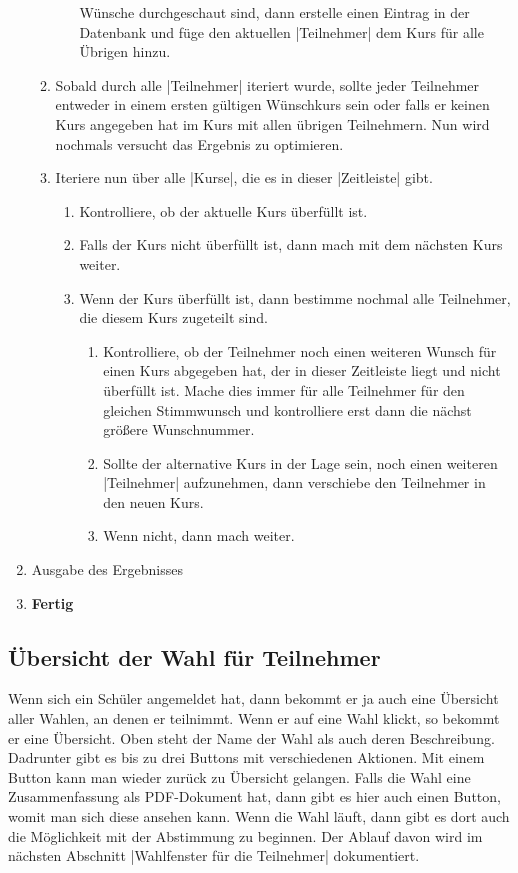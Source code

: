 \documentclass[ngerman]{ltxdoc}
\begin{document}
\begin{enumerate}
\begin{enumerate}
\begin{enumerate}
      Wünsche durchgeschaut sind, dann erstelle einen Eintrag in der Datenbank und
      füge den aktuellen |Teilnehmer| dem Kurs für alle Übrigen hinzu.
    \end{enumerate}
    \item Sobald durch alle |Teilnehmer| iteriert wurde, sollte jeder Teilnehmer
    entweder in einem ersten gültigen Wünschkurs sein oder falls er keinen Kurs
    angegeben hat im Kurs mit allen übrigen Teilnehmern. Nun wird nochmals
    versucht das Ergebnis zu optimieren.
    \item Iteriere nun über alle |Kurse|, die es in dieser |Zeitleiste| gibt.
    \begin{enumerate}
      \item Kontrolliere, ob der aktuelle Kurs überfüllt ist.
      \item Falls der Kurs nicht überfüllt ist, dann mach mit dem nächsten Kurs
      weiter.
      \item Wenn der Kurs überfüllt ist, dann bestimme nochmal alle Teilnehmer,
      die diesem Kurs zugeteilt sind.
      \begin{enumerate}
        \item Kontrolliere, ob der Teilnehmer noch einen weiteren Wunsch für einen
        Kurs abgegeben hat, der in dieser Zeitleiste liegt und nicht überfüllt ist.
        Mache dies immer für alle Teilnehmer für den gleichen Stimmwunsch und
        kontrolliere erst dann die nächst größere Wunschnummer.
        \item Sollte der alternative Kurs in der Lage sein, noch einen weiteren
        |Teilnehmer| aufzunehmen, dann verschiebe den Teilnehmer in den neuen Kurs.
        \item Wenn nicht, dann mach weiter.
      \end{enumerate}
    \end{enumerate}
  \end{enumerate}
  \item Ausgabe des Ergebnisses
  \item \textbf{Fertig}
\end{enumerate}

\subsection{Übersicht der Wahl für Teilnehmer}

Wenn sich ein Schüler angemeldet hat, dann bekommt er ja auch eine Übersicht
aller Wahlen, an denen er teilnimmt. Wenn er auf eine Wahl klickt, so bekommt
er eine Übersicht. Oben steht der Name der Wahl als auch deren Beschreibung. Dadrunter
gibt es bis zu drei Buttons mit verschiedenen Aktionen. Mit einem Button kann man
wieder zurück zu Übersicht gelangen. Falls die Wahl eine Zusammenfassung als
PDF-Dokument hat, dann gibt es hier auch einen Button, womit man sich diese ansehen kann.
Wenn die Wahl läuft, dann gibt es dort auch die Möglichkeit mit der Abstimmung
zu beginnen. Der Ablauf davon wird im nächsten Abschnitt |Wahlfenster für die Teilnehmer|
dokumentiert.
\end{document}
